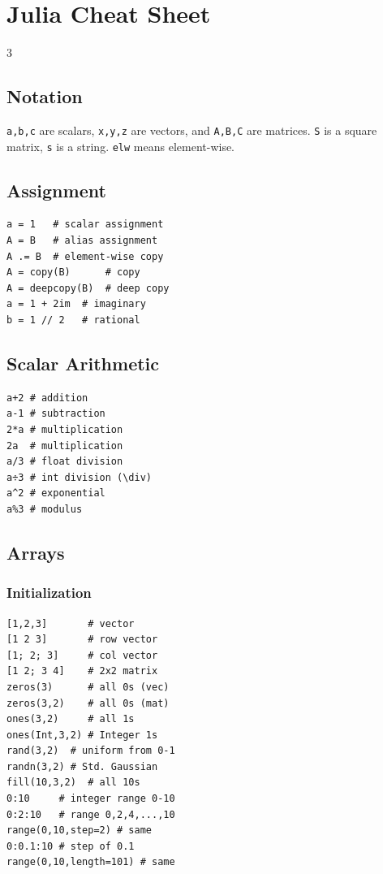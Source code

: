 


% 
\section{Julia Cheat Sheet}
\begin{multicols*}{3}
\subsection{Notation}
\texttt{a,b,c} are scalars,
\texttt{x,y,z} are vectors, and
\texttt{A,B,C} are matrices.
\texttt{S} is a square matrix,
\texttt{s} is a string.
\texttt{elw} means element-wise.

\subsection{Assignment}
\begin{verbatim}
a = 1   # scalar assignment
A = B   # alias assignment
A .= B  # element-wise copy
A = copy(B)      # copy
A = deepcopy(B)  # deep copy
a = 1 + 2im  # imaginary
b = 1 // 2   # rational
\end{verbatim}

\subsection{Scalar Arithmetic}
\begin{verbatim}
a+2 # addition 
a-1 # subtraction
2*a # multiplication
2a  # multiplication
a/3 # float division
a÷3 # int division (\div)
a^2 # exponential
a%3 # modulus
\end{verbatim}

\subsection{Arrays}
\subsubsection{Initialization}
\vspace*{-2mm}
\begin{verbatim}
[1,2,3]       # vector
[1 2 3]       # row vector
[1; 2; 3]     # col vector
[1 2; 3 4]    # 2x2 matrix
zeros(3)      # all 0s (vec)
zeros(3,2)    # all 0s (mat)
ones(3,2)     # all 1s 
ones(Int,3,2) # Integer 1s
rand(3,2)  # uniform from 0-1
randn(3,2) # Std. Gaussian 
fill(10,3,2)  # all 10s
0:10     # integer range 0-10
0:2:10   # range 0,2,4,...,10
range(0,10,step=2) # same
0:0.1:10 # step of 0.1
range(0,10,length=101) # same
\end{verbatim}


\end{multicols*}
